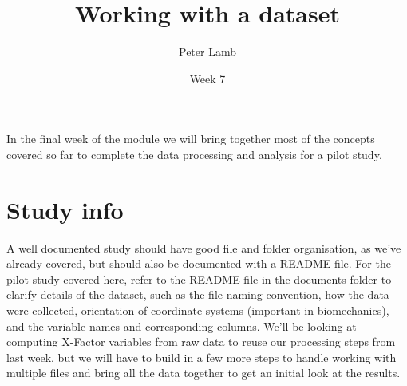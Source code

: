 \documentclass[12pt,a4paper]{article}
\title{Working with a dataset}
\author{Peter Lamb}
\date{Week 7}
\begin{document}
\maketitle



In the final week of the module we will bring together most of the concepts covered so far to complete the data processing and analysis for a pilot study.

\section{Study info}
A well documented study should have good file and folder organisation, as we've already covered, but should also be documented with a README file.
For the pilot study covered here, refer to the README file in the documents folder to clarify details of the dataset, such as the file naming convention, how the data were collected, orientation of coordinate systems (important in biomechanics), and the variable names and corresponding columns.
We'll be looking at computing X-Factor variables from raw data to reuse our processing steps from last week, but we will have to build in a few more steps to handle working with multiple files and bring all the data together to get an initial look at the results.
\end{document}
